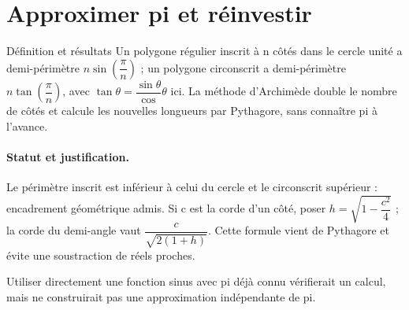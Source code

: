 \section{Approximer pi et réinvestir}\label{C10-U5}
\begin{repere}{Définition et résultats}
Un polygone régulier inscrit à n côtés dans le cercle unité a demi-périmètre $n\sin (\dfrac{\pi}{n})$ ; un polygone circonscrit a demi-périmètre $n\tan (\dfrac{\pi}{n})$, avec $\tan \theta =\dfrac{\sin \theta}{\cos}\theta $ ici. La méthode d’Archimède double le nombre de côtés et calcule les nouvelles longueurs par Pythagore, sans connaître pi à l’avance.
\end{repere}
\paragraph{Statut et justification.} Le périmètre inscrit est inférieur à celui du cercle et le circonscrit supérieur : encadrement géométrique admis. Si c est la corde d’un côté, poser $h=\sqrt {1-\dfrac{c^2}{4}}$ ; la corde du demi-angle vaut $\dfrac{c}{\sqrt {2(1+h)}}$. Cette formule vient de Pythagore et évite une soustraction de réels proches.
\label{C10-EX5}
\begin{erreur}Utiliser directement une fonction sinus avec pi déjà connu vérifierait un calcul, mais ne construirait pas une approximation indépendante de pi.\end{erreur}
\label{C10-AP5}
